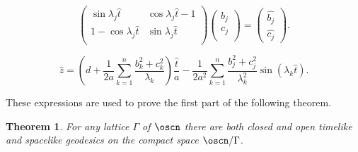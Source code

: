 \documentclass[11pt]{amsart}
\theoremstyle{plain}
\newtheorem{thm}{Theorem}[section]
\theoremstyle{definition}
\theoremstyle{remark}
\begin{document}
		\begin{equation}\label{oscilador_geos_1}
			\left( \begin{matrix}
				\sin{\lambda_j \hat{t}} & \cos{\lambda_j \hat{t}} -1 \\
				1 - \cos{\lambda_j \hat{t}} & \sin{\lambda_j \hat{t}} \\
			\end{matrix} \right)
			\left( \begin{matrix}
				b_j \\
				c_j \\
			\end{matrix} \right)=
			\left( \begin{matrix}
				\hat{b_j} \\
				\hat{c_j}
			\end{matrix} \right).
		\end{equation}
		
		\begin{equation}\label{oscilador_geos_2}
			\hat{z} =  \left(d + \frac{1}{2 a} \sum_{k=1}^{n} \frac{ b_{k}^{2}+c_k^{2}}{\lambda_k}\right)\frac{\hat{t}}{a}- \frac{1}{2 a^{2}}  \sum_{k=1}^{n} \frac{b_{j}^{2}+c_j^2}{\lambda_k^{2}} \sin(\lambda_k \hat{t}).
		\end{equation}
		
		These expressions are used to prove the first part of the following theorem.
		
			\begin{thm}
			For any lattice $\Gamma$ of $\oscn$ there are both closed and open timelike and spacelike geodesics on the compact space $\oscn / \Gamma$.
		\end{thm}
		
\end{document}
